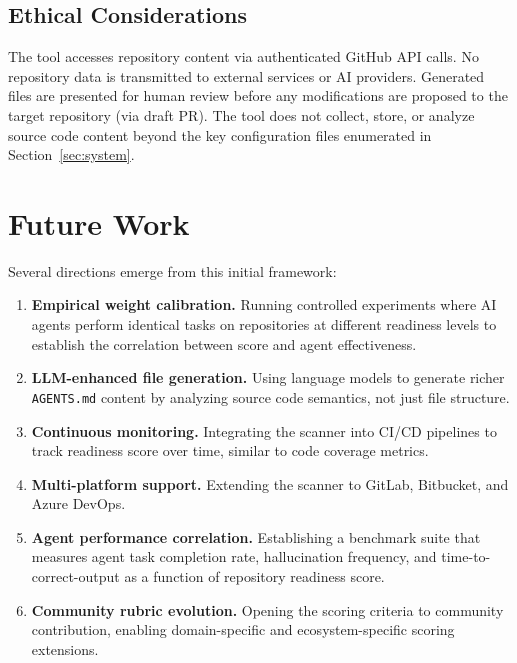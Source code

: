 \documentclass[11pt,twocolumn]{article}
\begin{document}
\subsection{Ethical Considerations}

The tool accesses repository content via authenticated GitHub API calls.
No repository data is transmitted to external services or AI providers.
Generated files are presented for human review before any modifications
are proposed to the target repository (via draft PR). The tool does
not collect, store, or analyze source code content beyond the key
configuration files enumerated in Section~\ref{sec:system}.

\section{Future Work}
\label{sec:future}

Several directions emerge from this initial framework:

\begin{enumerate}[leftmargin=1.5em]
    \item \textbf{Empirical weight calibration.} Running controlled
          experiments where AI agents perform identical tasks on
          repositories at different readiness levels to establish
          the correlation between score and agent effectiveness.
    \item \textbf{LLM-enhanced file generation.} Using language models
          to generate richer \texttt{AGENTS.md} content by analyzing
          source code semantics, not just file structure.
    \item \textbf{Continuous monitoring.} Integrating the scanner into
          CI/CD pipelines to track readiness score over time, similar
          to code coverage metrics.
    \item \textbf{Multi-platform support.} Extending the scanner to
          GitLab, Bitbucket, and Azure DevOps.
    \item \textbf{Agent performance correlation.} Establishing a
          benchmark suite that measures agent task completion rate,
          hallucination frequency, and time-to-correct-output as a
          function of repository readiness score.
    \item \textbf{Community rubric evolution.} Opening the scoring
          criteria to community contribution, enabling domain-specific
          and ecosystem-specific scoring extensions.
\end{enumerate}
\end{document}
